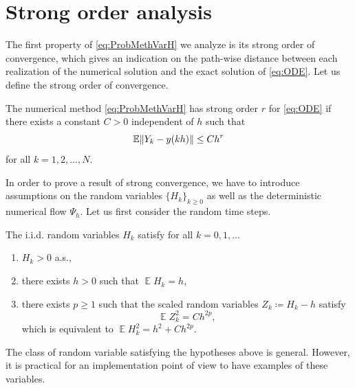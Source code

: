 \documentclass{siamart1116}
\numberwithin{theorem}{section}
\DeclarePairedDelimiter{\norm}{\|}{\|}
\newcommand{\defeq}{\coloneqq}
\newcommand{\E}{\operatorname{\mathbb{E}}}
\begin{document}
\section{Strong order analysis}\label{sec:StrongOrder}

The first property of \eqref{eq:ProbMethVarH} we analyze is its strong order of convergence, which gives an indication on the path-wise distance between each realization of the numerical solution and the exact solution of \eqref{eq:ODE}. Let us define the strong order of convergence. 
\begin{definition} The numerical method \eqref{eq:ProbMethVarH} has strong order $r$ for \eqref{eq:ODE} if there exists a constant $C > 0$ independent of $h$ such that
	\begin{equation}
	\E\norm{Y_k - y(kh)} \leq Ch^r
	\end{equation}
	for all $k = 1, 2, \ldots, N$.
\end{definition} 
In order to prove a result of strong convergence, we have to introduce assumptions on the random variables $\{H_k\}_{k\geq 0}$ as well as the deterministic numerical flow $\Psi_h$. Let us first consider the random time steps.
\begin{assumption}\label{as:hStrong} The i.i.d. random variables $H_k$ satisfy for all $k = 0, 1, \ldots$
	\begin{enumerate}
		\item\label{as:hStrong_Pos} $H_k > 0$ a.s.,
		\item\label{as:hStrong_E} there exists $h > 0$ such that $\E H_k = h$,
		\item\label{as:hStrong_Var} there exists $p \geq 1$ such that the scaled random variables $Z_k \defeq H_k - h$ satisfy
		\begin{equation}
			\E Z_k^2 = Ch^{2p},
		\end{equation}
		which is equivalent to $\E H_k^2 = h^2 + Ch^{2p}$.
	\end{enumerate}
\end{assumption}
The class of random variable satisfying the hypotheses above is general. However, it is practical for an implementation point of view to have examples of these variables.
\end{document}
